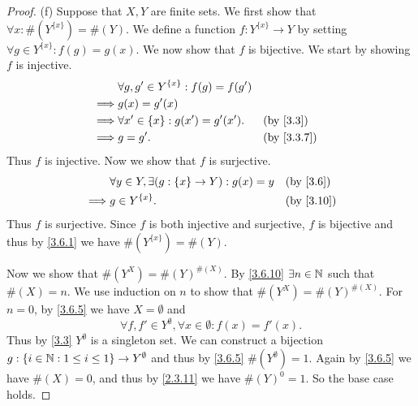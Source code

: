 \begin{proof}{(f)}
  Suppose that \(X, Y\) are finite sets.
  We first show that \(\forall x : \#(Y^{\{x\}}) = \#(Y)\).
  We define a function \(f : Y^{\{x\}} \to Y\) by setting \(\forall g \in Y^{\{x\}} : f(g) = g(x)\).
  We now show that \(f\) is bijective.
  We start by showing \(f\) is injective.
  \begin{align*}
             & \forall g, g' \in Y^{\{x\}} : f(g) = f(g')                             \\
    \implies & g(x) = g'(x)                                                           \\
    \implies & \forall x' \in \{x\} : g(x') = g'(x').     &  & \text{(by \cref{3.3})} \\
    \implies & g = g'.                                    &  & \by{3.3.7}
  \end{align*}
  Thus \(f\) is injective.
  Now we show that \(f\) is surjective.
  \begin{align*}
             & \forall y \in Y, \exists (g : \{x\} \to Y) : g(x) = y &  & \text{(by \cref{3.6})}  \\
    \implies & g \in Y^{\{x\}}.                                      &  & \text{(by \cref{3.10})}
  \end{align*}
  Thus \(f\) is surjective.
  Since \(f\) is both injective and surjective, \(f\) is bijective and thus by \cref{3.6.1} we have \(\#(Y^{\{x\}}) = \#(Y)\).

  Now we show that \(\#(Y^X) = \#(Y)^{\#(X)}\).
  By \cref{3.6.10} \(\exists n \in \mathbb{N}\) such that \(\#(X) = n\).
  We use induction on \(n\) to show that \(\#(Y^X) = \#(Y)^{\#(X)}\).
  For \(n = 0\), by \cref{3.6.5} we have \(X = \emptyset\) and
  \[
    \forall f, f' \in Y^\emptyset, \forall x \in \emptyset : f(x) = f'(x).
  \]
  Thus by \cref{3.3} \(Y^\emptyset\) is a singleton set.
  We can construct a bijection \(g : \{i \in \mathbb{N} : 1 \leq i \leq 1\} \to Y^\emptyset\) and thus by \cref{3.6.5} \(\#(Y^\emptyset) = 1\).
  Again by \cref{3.6.5} we have \(\#(X) = 0\), and thus by \cref{2.3.11} we have \(\#(Y)^0 = 1\).
  So the base case holds.


\end{proof}

